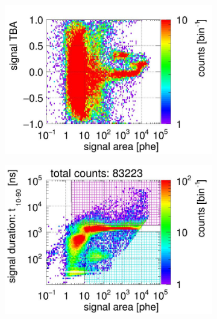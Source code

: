 \begin{landscape}
\begin{figure}[!p]
\begin{subfigure}[t]{0.33\textwidth}
			\includegraphics[width=\figurewidth,clip,trim={0 0 0 40}]{Figures/GasTest/CutsValid/res64771/tbapaX23Vecfig64771.jpg}
			\caption{}
			\label{fig:signal selection dv 16 02}
		\end{subfigure}
		\begin{subfigure}[t]{0.33\textwidth}
			\centering
			\includegraphics[width=\figurewidth,clip,trim={0 98 0 0}]{Figures/GasTest/CutsValid/res64771/pdpa26Vecfig64771.jpg}

\end{subfigure}
\end{figure}
\end{landscape}
